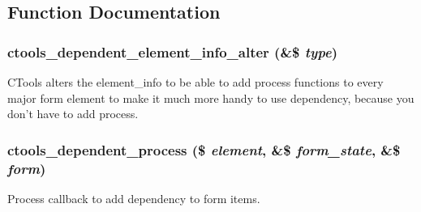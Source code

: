 \subsection{Function Documentation}
\hypertarget{dependent_8inc_a47834c9e31868db6efb1d5d04e34dbfc}{
\subsubsection[{ctools\_\-dependent\_\-element\_\-info\_\-alter}]{\setlength{\rightskip}{0pt plus 5cm}ctools\_\-dependent\_\-element\_\-info\_\-alter (\&\$ {\em type})}}
\label{dependent_8inc_a47834c9e31868db6efb1d5d04e34dbfc}
CTools alters the element\_\-info to be able to add process functions to every major form element to make it much more handy to use dependency, because you don't have to add process. \hypertarget{dependent_8inc_aa4105a7a7db8a659ab7d7a76a4c541e0}{
\subsubsection[{ctools\_\-dependent\_\-process}]{\setlength{\rightskip}{0pt plus 5cm}ctools\_\-dependent\_\-process (\$ {\em element}, \/  \&\$ {\em form\_\-state}, \/  \&\$ {\em form})}}
\label{dependent_8inc_aa4105a7a7db8a659ab7d7a76a4c541e0}
Process callback to add dependency to form items. 
